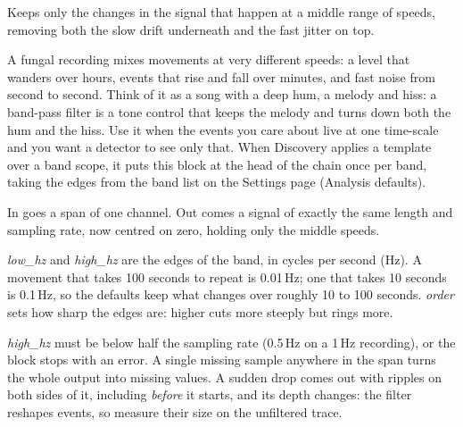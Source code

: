 Keeps only the changes in the signal that happen at a middle range of speeds, removing both
the slow drift underneath and the fast jitter on top.

A fungal recording mixes movements at very different speeds: a level that wanders over hours,
events that rise and fall over minutes, and fast noise from second to second. Think of it as a
song with a deep hum, a melody and hiss: a band-pass filter is a tone control that keeps the
melody and turns down both the hum and the hiss. Use it when the events you care about live at
one time-scale and you want a detector to see only that. When Discovery applies a template
over a band scope, it puts this block at the head of the chain once per band, taking the edges
from the band list on the Settings page (Analysis defaults).

In goes a span of one channel. Out comes a signal of exactly the same length and sampling rate,
now centred on zero, holding only the middle speeds.

\emph{low\_hz} and \emph{high\_hz} are the edges of the band, in cycles per second (Hz). A
movement that takes 100 seconds to repeat is 0.01\,Hz; one that takes 10 seconds is 0.1\,Hz,
so the defaults keep what changes over roughly 10 to 100 seconds. \emph{order} sets how sharp
the edges are: higher cuts more steeply but rings more.

\emph{high\_hz} must be below half the sampling rate (0.5\,Hz on a 1\,Hz recording), or the
block stops with an error. A single missing sample anywhere in the span turns the whole output
into missing values. A sudden drop comes out with ripples on both sides of it, including
\emph{before} it starts, and its depth changes: the filter reshapes events, so measure their
size on the unfiltered trace.
